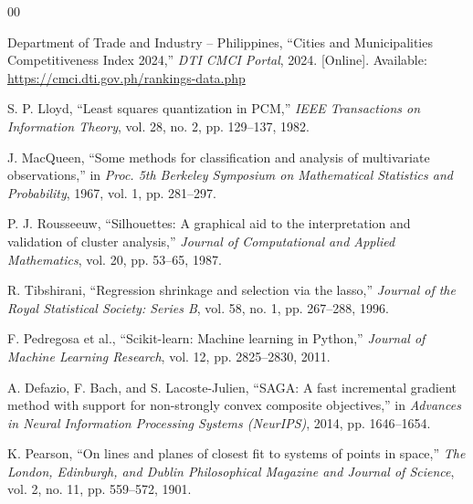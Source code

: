 \documentclass[conference]{IEEEtran}
\begin{document}
\begin{thebibliography}{00}

Department of Trade and Industry -- Philippines, ``Cities and Municipalities Competitiveness Index 2024,'' \textit{DTI CMCI Portal}, 2024. [Online]. Available: \url{https://cmci.dti.gov.ph/rankings-data.php}

S. P. Lloyd, ``Least squares quantization in PCM,'' \textit{IEEE Transactions on Information Theory}, vol. 28, no. 2, pp. 129--137, 1982.

J. MacQueen, ``Some methods for classification and analysis of multivariate observations,'' in \textit{Proc. 5th Berkeley Symposium on Mathematical Statistics and Probability}, 1967, vol. 1, pp. 281--297.

P. J. Rousseeuw, ``Silhouettes: A graphical aid to the interpretation and validation of cluster analysis,'' \textit{Journal of Computational and Applied Mathematics}, vol. 20, pp. 53--65, 1987.

R. Tibshirani, ``Regression shrinkage and selection via the lasso,'' \textit{Journal of the Royal Statistical Society: Series B}, vol. 58, no. 1, pp. 267--288, 1996.

F. Pedregosa et al., ``Scikit-learn: Machine learning in Python,'' \textit{Journal of Machine Learning Research}, vol. 12, pp. 2825--2830, 2011.

A. Defazio, F. Bach, and S. Lacoste-Julien, ``SAGA: A fast incremental gradient method with support for non-strongly convex composite objectives,'' in \textit{Advances in Neural Information Processing Systems (NeurIPS)}, 2014, pp. 1646--1654.

K. Pearson, ``On lines and planes of closest fit to systems of points in space,'' \textit{The London, Edinburgh, and Dublin Philosophical Magazine and Journal of Science}, vol. 2, no. 11, pp. 559--572, 1901.

\end{thebibliography}
\end{document}
